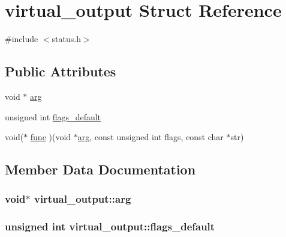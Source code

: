 \hypertarget{structvirtual__output}{}\section{virtual\+\_\+output Struct Reference}
\label{structvirtual__output}


{\ttfamily \#include $<$status.\+h$>$}

\subsection*{Public Attributes}
\begin{DoxyCompactItemize}
\item 
void $\ast$ \hyperlink{structvirtual__output_a639adc0ce1cc4e0d66561c894fe3b3cf}{arg}
\item 
unsigned int \hyperlink{structvirtual__output_a157077b31c82b1452fb04a9ecb63744c}{flags\+\_\+default}
\item 
void($\ast$ \hyperlink{structvirtual__output_ab0b2c2556a9e7b564f54c756ee94b270}{func} )(void $\ast$\hyperlink{structvirtual__output_a639adc0ce1cc4e0d66561c894fe3b3cf}{arg}, const unsigned int flags, const char $\ast$str)
\end{DoxyCompactItemize}


\subsection{Member Data Documentation}
\hypertarget{structvirtual__output_a639adc0ce1cc4e0d66561c894fe3b3cf}{}
\subsubsection[{arg}]{\setlength{\rightskip}{0pt plus 5cm}void$\ast$ virtual\+\_\+output\+::arg}\label{structvirtual__output_a639adc0ce1cc4e0d66561c894fe3b3cf}
\hypertarget{structvirtual__output_a157077b31c82b1452fb04a9ecb63744c}{}
\subsubsection[{flags\+\_\+default}]{\setlength{\rightskip}{0pt plus 5cm}unsigned int virtual\+\_\+output\+::flags\+\_\+default}\label{structvirtual__output_a157077b31c82b1452fb04a9ecb63744c}
\hypertarget{structvirtual__output_ab0b2c2556a9e7b564f54c756ee94b270}{}
